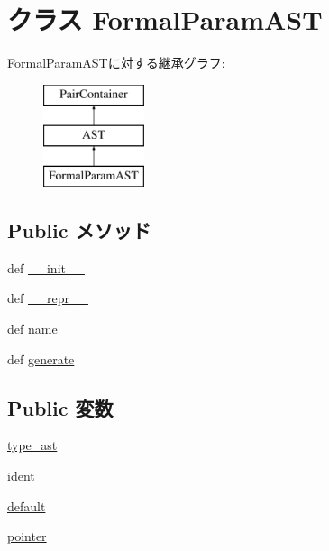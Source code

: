\hypertarget{classslicc_1_1ast_1_1FormalParamAST_1_1FormalParamAST}{
\section{クラス FormalParamAST}
\label{classslicc_1_1ast_1_1FormalParamAST_1_1FormalParamAST}
}
FormalParamASTに対する継承グラフ:\begin{figure}[H]
\begin{center}
\leavevmode
\includegraphics[height=3cm]{classslicc_1_1ast_1_1FormalParamAST_1_1FormalParamAST}
\end{center}
\end{figure}
\subsection*{Public メソッド}
\begin{DoxyCompactItemize}
\item 
def \hyperlink{classslicc_1_1ast_1_1FormalParamAST_1_1FormalParamAST_ac775ee34451fdfa742b318538164070e}{\_\-\_\-init\_\-\_\-}
\item 
def \hyperlink{classslicc_1_1ast_1_1FormalParamAST_1_1FormalParamAST_ad8b9328939df072e4740cd9a63189744}{\_\-\_\-repr\_\-\_\-}
\item 
def \hyperlink{classslicc_1_1ast_1_1FormalParamAST_1_1FormalParamAST_a757840459670ee7692e00cf5ddc722d5}{name}
\item 
def \hyperlink{classslicc_1_1ast_1_1FormalParamAST_1_1FormalParamAST_a4555d1cee0dccf3942ea35fe86de2e8e}{generate}
\end{DoxyCompactItemize}
\subsection*{Public 変数}
\begin{DoxyCompactItemize}
\item 
\hyperlink{classslicc_1_1ast_1_1FormalParamAST_1_1FormalParamAST_a2c41e611550596541faa6f64ffecc139}{type\_\-ast}
\item 
\hyperlink{classslicc_1_1ast_1_1FormalParamAST_1_1FormalParamAST_a2fe57e2d3d2cba9a3aeba2f629eaa78b}{ident}
\item 
\hyperlink{classslicc_1_1ast_1_1FormalParamAST_1_1FormalParamAST_affb1327b18bf08a379d19eef89cf1ed1}{default}
\item 
\hyperlink{classslicc_1_1ast_1_1FormalParamAST_1_1FormalParamAST_a3f03bb7e120fad95c7a819c1cb088df9}{pointer}
\end{DoxyCompactItemize}



